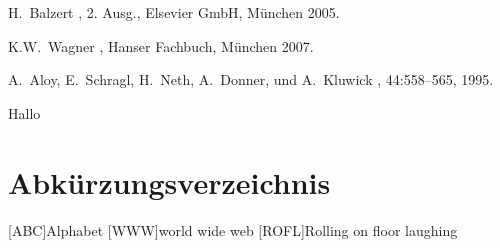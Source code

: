 \documentclass[Master, BBE, english]{twbook}
\begin{document}
\clearpage

\begin{thebibliography}{99}
H.~Balzert ,  2. Ausg., Elsevier GmbH, München 2005.

K.W.~Wagner , Hanser Fachbuch, München 2007.

A.~Aloy, E.~Schragl, H.~Neth, A.~Donner, und A.~Kluwick 
, 44:558--565, 1995.
\end{thebibliography}
\clearpage
Hallo
\clearpage

\listoffigures
\clearpage

\listoftables
\clearpage

{}
\chapter*{Abkürzungsverzeichnis}
\begin{acronym}[XXXXX]
	[ABC]{Alphabet}
	[WWW]{world wide web}
	[ROFL]{Rolling on floor laughing}
\end{acronym}
\end{document}
